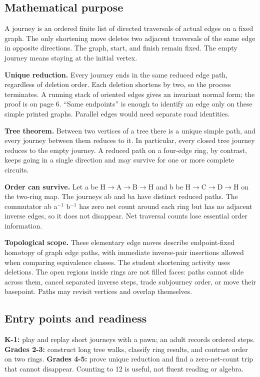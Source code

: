 \subsection*{Mathematical purpose}
A journey is an ordered finite list of directed traversals of actual edges on a fixed graph. The only shortening move deletes two adjacent traversals of the same edge in opposite directions. The graph, start, and finish remain fixed. The empty journey means staying at the initial vertex.

\textbf{Unique reduction.} Every journey ends in the same reduced edge path, regardless of deletion order. Each deletion shortens by two, so the process terminates. A running stack of oriented edges gives an invariant normal form; the proof is on page 6. ``Same endpoints'' is enough to identify an edge only on these simple printed graphs. Parallel edges would need separate road identities.

\textbf{Tree theorem.} Between two vertices of a tree there is a unique simple path, and every journey between them reduces to it. In particular, every closed tree journey reduces to the empty journey. A reduced path on a four-edge ring, by contrast, keeps going in a single direction and may survive for one or more complete circuits.

\textbf{Order can survive.} Let a be H$\to$A$\to$B$\to$H and b be H$\to$C$\to$D$\to$H on the two-ring map. The journeys ab and ba have distinct reduced paths. The commutator ab a$^{-1}$ b$^{-1}$ has zero net count around each ring but has no adjacent inverse edges, so it does not disappear. Net traversal counts lose essential order information.

\textbf{Topological scope.} These elementary edge moves describe endpoint-fixed homotopy of graph edge paths, with immediate inverse-pair insertions allowed when comparing equivalence classes. The student shortening activity uses deletions. The open regions inside rings are not filled faces: paths cannot slide across them, cancel separated inverse steps, trade subjourney order, or move their basepoint. Paths may revisit vertices and overlap themselves.

\subsection*{Entry points and readiness}
\textbf{K-1:} play and replay short journeys with a pawn; an adult records ordered steps. \textbf{Grades 2-3:} construct long tree walks, classify ring results, and contrast order on two rings. \textbf{Grades 4-5:} prove unique reduction and find a zero-net-count trip that cannot disappear. Counting to 12 is useful, not fluent reading or algebra.

